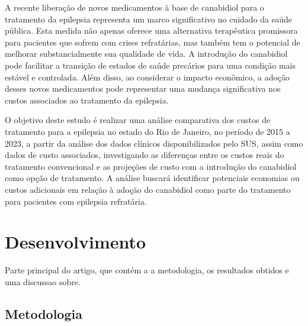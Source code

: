 \documentclass[article,a4paper,12pt,brazil,sumario=tradicional]{abntex2}
\begin{document}
A recente liberação de novos medicamentos à base de canabidiol para o tratamento da epilepsia representa um marco significativo no cuidado da saúde pública. Esta medida não apenas oferece uma alternativa terapêutica promissora para pacientes que sofrem com crises refratárias, mas também tem o potencial de melhorar substancialmente sua qualidade de vida. A introdução do canabidiol pode facilitar a transição de estados de saúde precários para uma condição mais estável e controlada. Além disso, ao considerar o impacto econômico, a adoção desses novos medicamentos pode representar uma mudança significativa nos custos associados ao tratamento da epilepsia.

O objetivo deste estudo é realizar uma análise comparativa dos custos de tratamento para a epilepsia no estado do Rio de Janeiro, no período de 2015 a 2023, a partir da análise dos dados clínicos disponibilizados pelo SUS, assim como dados de custo associados, investigando as diferenças entre os custos reais do tratamento convencional e as projeções de custo com a introdução do canabidiol como opção de tratamento. A análise buscará identificar potenciais economias ou custos adicionais em relação à adoção do canabidiol como parte do tratamento para pacientes com epilepsia refratária.

\section{Desenvolvimento}

Parte principal do artigo, que contém a a metodologia, os resultados obtidos e uma discussao sobre. 

\subsection{Metodologia}
\end{document}
